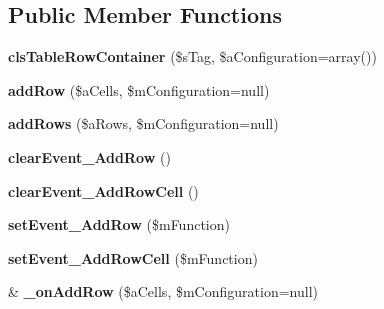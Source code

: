 \subsection*{Public Member Functions}
\begin{DoxyCompactItemize}
\item 
\hypertarget{classclsTableRowContainer_af2402e19e5520ad0857cfab4dea73e20}{
{\bfseries clsTableRowContainer} (\$sTag, \$aConfiguration=array())}
\label{classclsTableRowContainer_af2402e19e5520ad0857cfab4dea73e20}

\item 
\hypertarget{classclsTableRowContainer_aff308e38ea3b57917830d51c5b722e66}{
{\bfseries addRow} (\$aCells, \$mConfiguration=null)}
\label{classclsTableRowContainer_aff308e38ea3b57917830d51c5b722e66}

\item 
\hypertarget{classclsTableRowContainer_abc5fdfcd773bc89a7bc66e348b10eff9}{
{\bfseries addRows} (\$aRows, \$mConfiguration=null)}
\label{classclsTableRowContainer_abc5fdfcd773bc89a7bc66e348b10eff9}

\item 
\hypertarget{classclsTableRowContainer_a290b88fee98ffc27e9bbcf24b7e43261}{
{\bfseries clearEvent\_\-AddRow} ()}
\label{classclsTableRowContainer_a290b88fee98ffc27e9bbcf24b7e43261}

\item 
\hypertarget{classclsTableRowContainer_a83c99da563d69459c40ad4d96ad9ade1}{
{\bfseries clearEvent\_\-AddRowCell} ()}
\label{classclsTableRowContainer_a83c99da563d69459c40ad4d96ad9ade1}

\item 
\hypertarget{classclsTableRowContainer_a6f2db754dd2808b878dfd6f375d39d24}{
{\bfseries setEvent\_\-AddRow} (\$mFunction)}
\label{classclsTableRowContainer_a6f2db754dd2808b878dfd6f375d39d24}

\item 
\hypertarget{classclsTableRowContainer_a9d059cbeb19cb78d118002a2f5a5f9a0}{
{\bfseries setEvent\_\-AddRowCell} (\$mFunction)}
\label{classclsTableRowContainer_a9d059cbeb19cb78d118002a2f5a5f9a0}

\item 
\hypertarget{classclsTableRowContainer_a82a93f90449657f15728df360049203a}{
\& {\bfseries \_\-onAddRow} (\$aCells, \$mConfiguration=null)}
\label{classclsTableRowContainer_a82a93f90449657f15728df360049203a}

\end{DoxyCompactItemize}
